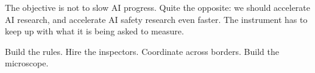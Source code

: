 \documentclass[12pt]{article}
\begin{document}
The objective is not to slow AI progress. Quite the opposite: we should
accelerate AI research, and accelerate AI safety research even faster. The
instrument has to keep up with what it is being asked to measure.

Build the rules. Hire the inspectors. Coordinate across borders. Build the
microscope.

\printbibliography
\end{document}
